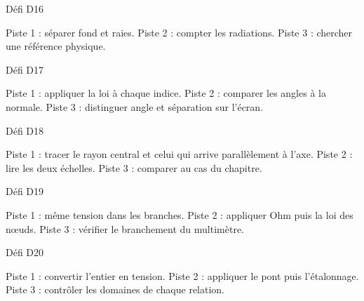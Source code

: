 \par\addvspace{3mm}\noindent\begin{minipage}{\linewidth}
{\otSemi\color{otNavy}Défi D16}\label{indice-16}\par\vspace{1mm}
Piste 1 : séparer fond et raies. Piste 2 : compter les radiations. Piste 3 : chercher une référence physique.
\end{minipage}\par

\par\addvspace{3mm}\noindent\begin{minipage}{\linewidth}
{\otSemi\color{otNavy}Défi D17}\label{indice-17}\par\vspace{1mm}
Piste 1 : appliquer la loi à chaque indice. Piste 2 : comparer les angles à la normale. Piste 3 : distinguer angle et séparation sur l’écran.
\end{minipage}\par

\par\addvspace{3mm}\noindent\begin{minipage}{\linewidth}
{\otSemi\color{otNavy}Défi D18}\label{indice-18}\par\vspace{1mm}
Piste 1 : tracer le rayon central et celui qui arrive parallèlement à l’axe. Piste 2 : lire les deux échelles. Piste 3 : comparer au cas du chapitre.
\end{minipage}\par

\par\addvspace{3mm}\noindent\begin{minipage}{\linewidth}
{\otSemi\color{otNavy}Défi D19}\label{indice-19}\par\vspace{1mm}
Piste 1 : même tension dans les branches. Piste 2 : appliquer Ohm puis la loi des nœuds. Piste 3 : vérifier le branchement du multimètre.
\end{minipage}\par

\par\addvspace{3mm}\noindent\begin{minipage}{\linewidth}
{\otSemi\color{otNavy}Défi D20}\label{indice-20}\par\vspace{1mm}
Piste 1 : convertir l’entier en tension. Piste 2 : appliquer le pont puis l’étalonnage. Piste 3 : contrôler les domaines de chaque relation.
\end{minipage}\par

